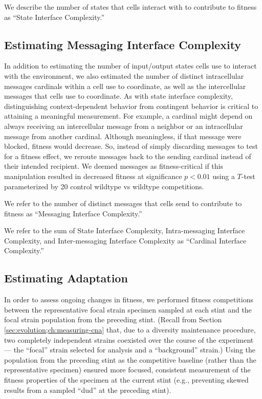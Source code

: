 We describe the number of states that cells interact with to contribute to fitness as ``State Interface Complexity.''

\subsection{Estimating Messaging Interface Complexity}
\label{sec:estimating-messaging-interface-complexity;ch:measuring-cna}

In addition to estimating the number of input/output states cells use to interact with the environment, we also estimated the number of distinct intracellular messages cardinals within a cell use to coordinate, as well as the intercellular messages that cells use to coordinate.
As with state interface complexity, distinguishing context-dependent behavior from contingent behavior is critical to attaining a meaningful measurement.
For example, a cardinal might depend on always receiving an intercellular message from a neighbor or an intracellular message from another cardinal.
Although meaningless, if that message were blocked, fitness would decrease.
So, instead of simply discarding messages to test for a fitness effect, we reroute messages back to the sending cardinal instead of their intended recipient.
We deemed messages as fitness-critical if this manipulation resulted in decreased fitness at significance $p < 0.01$ using a $T$-test parameterized by 20 control wildtype vs wildtype competitions.

We refer to the number of distinct messages that cells send to contribute to fitness as ``Messaging Interface Complexity.''

We refer to the sum of State Interface Complexity, Intra-messaging Interface Complexity, and Inter-messaging Interface Complexity as ``Cardinal Interface Complexity.''

\subsection{Estimating Adaptation}
\label{sec:measuring-adaptation;ch:measuring-cna}

In order to assess ongoing changes in fitness, we performed fitness competitions between the representative focal strain specimen sampled at each stint and the focal strain population from the preceding stint.
(Recall from Section \ref{sec:evolution;ch:measuring-cna} that, due to a diversity maintenance procedure, two completely independent strains coexisted over the course of the experiment --- the ``focal'' strain selected for analysis and a ``background'' strain.)
Using the population from the preceding stint as the competitive baseline (rather than the representative specimen) ensured more focused, consistent measurement of the fitness properties of the specimen at the current stint (e.g., preventing skewed results from a sampled ``dud'' at the preceding stint).


